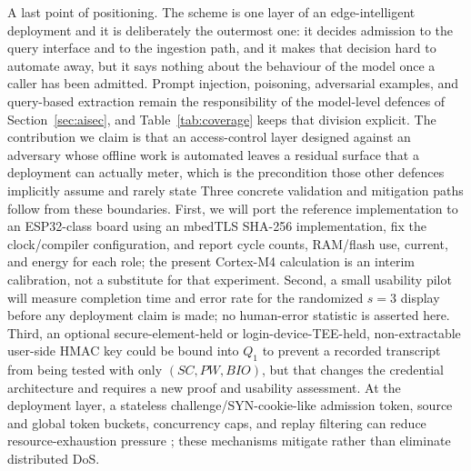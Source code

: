 \documentclass[cmc,article,submit,moreauthors,pdftex]{Definitions/tsp}
\providecommand{\DIFadd}[1]{{\protect\color{blue} \sf #1}} %
\providecommand{\DIFdel}[1]{{\protect\color{red} \scriptsize #1}} %
\providecommand{\DIFaddbegin}{} %
\providecommand{\DIFaddend}{} %
\providecommand{\DIFdelbegin}{} %
\providecommand{\DIFdelend}{} %
\begin{document}
\DIFdelbegin \DIFdel{A last point of positioning. The scheme is one layer of an edge-intelligent deployment and it is deliberately the outermost one: it decides admission to the query interface and to the ingestion path, and it makes that decision hard to automate away, but it says nothing about the behaviour of the model once a caller has been admitted. Prompt injection, poisoning, adversarial examples, and query-based extraction remain the responsibility of the model-level defences of Section~\ref{sec:aisec}, and Table~\ref{tab:coverage} keeps that division explicit. The contribution we claim is that an access-control layer designed against an adversary whose offline work is automated leaves a residual surface that a deployment can actually meter, which is the precondition those other defences implicitly assume and rarely state}\DIFdelend \DIFaddbegin \DIFadd{Three concrete validation and mitigation paths follow from these boundaries. First, we will port the reference implementation to an ESP32-class board using an mbedTLS SHA-256 implementation, fix the clock/compiler configuration, and report cycle counts, RAM/flash use, current, and energy for each role; the present Cortex-M4 calculation is an interim calibration, not a substitute for that experiment. Second, a small usability pilot will measure completion time and error rate for the randomized $s=3$ display before any deployment claim is made; no human-error statistic is asserted here. Third, an optional secure-element-held or login-device-TEE-held, non-extractable user-side HMAC key could be bound into $Q_1$ to prevent a recorded transcript from being tested with only $(SC,PW,BIO)$, but that changes the credential architecture and requires a new proof and usability assessment. At the deployment layer, a stateless challenge/SYN-cookie-like admission token, source and global token buckets, concurrency caps, and replay filtering can reduce resource-exhaustion pressure \cite{mirkovic2004taxonomy}; these mechanisms mitigate rather than eliminate distributed DoS}\DIFaddend .






\end{document}
